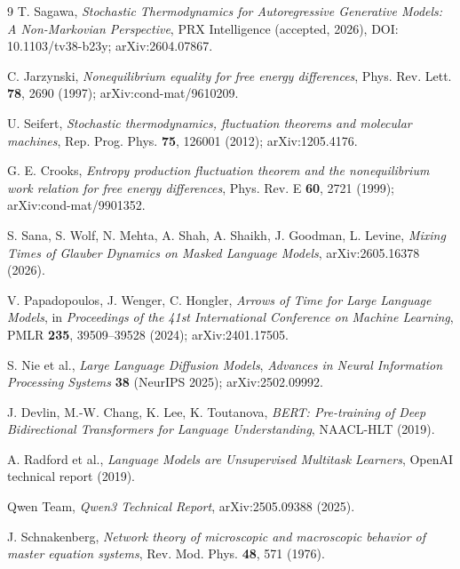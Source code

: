\documentclass[11pt]{article}
\begin{document}

\begin{thebibliography}{9}
T. Sagawa,
\emph{Stochastic Thermodynamics for Autoregressive Generative Models: A
Non-Markovian Perspective},
PRX Intelligence (accepted, 2026), DOI: 10.1103/tv38-b23y; arXiv:2604.07867.

C. Jarzynski,
\emph{Nonequilibrium equality for free energy differences},
Phys. Rev. Lett. \textbf{78}, 2690 (1997); arXiv:cond-mat/9610209.

U. Seifert,
\emph{Stochastic thermodynamics, fluctuation theorems and molecular
machines},
Rep. Prog. Phys. \textbf{75}, 126001 (2012); arXiv:1205.4176.

G. E. Crooks,
\emph{Entropy production fluctuation theorem and the nonequilibrium work
relation for free energy differences},
Phys. Rev. E \textbf{60}, 2721 (1999); arXiv:cond-mat/9901352.

S. Sana, S. Wolf, N. Mehta, A. Shah, A. Shaikh, J. Goodman, L. Levine,
\emph{Mixing Times of Glauber Dynamics on Masked Language Models},
arXiv:2605.16378 (2026).

V. Papadopoulos, J. Wenger, C. Hongler,
\emph{Arrows of Time for Large Language Models},
in \emph{Proceedings of the 41st International Conference on Machine Learning},
PMLR \textbf{235}, 39509--39528 (2024); arXiv:2401.17505.

S. Nie et al., \emph{Large Language Diffusion Models},
\emph{Advances in Neural Information Processing Systems} \textbf{38}
(NeurIPS 2025); arXiv:2502.09992.

J. Devlin, M.-W. Chang, K. Lee, K. Toutanova,
\emph{BERT: Pre-training of Deep Bidirectional Transformers for Language
Understanding}, NAACL-HLT (2019).

A. Radford et al., \emph{Language Models are Unsupervised Multitask Learners},
OpenAI technical report (2019).

Qwen Team, \emph{Qwen3 Technical Report}, arXiv:2505.09388 (2025).

J. Schnakenberg, \emph{Network theory of microscopic and macroscopic behavior
of master equation systems}, Rev. Mod. Phys. \textbf{48}, 571 (1976).
\end{thebibliography}
\end{document}
